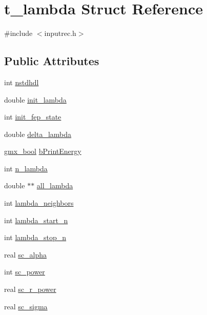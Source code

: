 \hypertarget{structt__lambda}{\section{t\-\_\-lambda \-Struct \-Reference}
\label{structt__lambda}
}


{\ttfamily \#include $<$inputrec.\-h$>$}

\subsection*{\-Public \-Attributes}
\begin{DoxyCompactItemize}
\item 
int \hyperlink{structt__lambda_a0666b9d4d2d000dcc179ba9e9f002e99}{nstdhdl}
\item 
double \hyperlink{structt__lambda_ad93bfa38d471490955e46dd6731907ed}{init\-\_\-lambda}
\item 
int \hyperlink{structt__lambda_aa39548b3f97364fb7763b8dedf68a0f3}{init\-\_\-fep\-\_\-state}
\item 
double \hyperlink{structt__lambda_a6cce734f772f684883b7c510bd8b9d9e}{delta\-\_\-lambda}
\item 
\hyperlink{include_2types_2simple_8h_a8fddad319f226e856400d190198d5151}{gmx\-\_\-bool} \hyperlink{structt__lambda_adb04c4ebb1ab165f2ad655905dc8e527}{b\-Print\-Energy}
\item 
int \hyperlink{structt__lambda_a958d461d4d071f5d85636c6cc3e79586}{n\-\_\-lambda}
\item 
double $\ast$$\ast$ \hyperlink{structt__lambda_af6705991007f6e466f9b4c3c66a15cfe}{all\-\_\-lambda}
\item 
int \hyperlink{structt__lambda_a72c9486c3a405891d2d1ad122ae19bfb}{lambda\-\_\-neighbors}
\item 
int \hyperlink{structt__lambda_a700b3929b8e71588211cd2f753f86eff}{lambda\-\_\-start\-\_\-n}
\item 
int \hyperlink{structt__lambda_a72b098b0eb3d039c20f0c43e265ac2f4}{lambda\-\_\-stop\-\_\-n}
\item 
real \hyperlink{structt__lambda_a2b572c531050b1ec603a1bc4ff36d20a}{sc\-\_\-alpha}
\item 
int \hyperlink{structt__lambda_acb465591afd6dcc9408f961a978d1711}{sc\-\_\-power}
\item 
real \hyperlink{structt__lambda_a71d75bf96ca8944fbb7c90d52b2713cf}{sc\-\_\-r\-\_\-power}
\item 
real \hyperlink{structt__lambda_a17c743561e6dcb9c8c758536d83979dd}{sc\-\_\-sigma}
$$
\end{DoxyCompactItemize}
